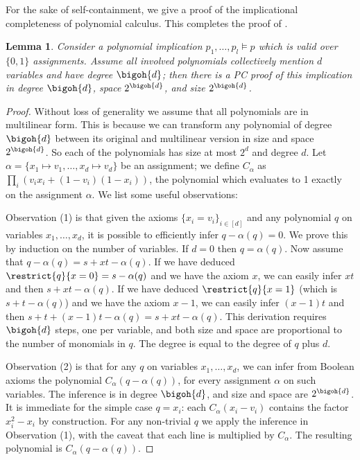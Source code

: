 \documentclass[11pt]{article}
\numberwithin{equation}{section}
\newtheorem{lemma}[theorem]{Lemma}
\theoremstyle{definition}
\theoremstyle{plain}
\begin{document}
For the sake of self-containment, we give a proof of the
implicational completeness of polynomial calculus. This completes the proof
%
of .    %

\begin{lemma}\label{lmm:pccompleteness}
  Consider a polynomial implication $p_{1}, \ldots, p_{l}\models p$ which is valid over $\{0,1\}$ assignments. Assume all involved polynomials collectively mention $d$ variables and have degree $\bigoh{d}$; then there is a PC proof of this implication in degree $\bigoh{d}$, space $2^{\bigoh{d}}$, and size $2^{\bigoh{d}}$.
\end{lemma}
\begin{proof} Without loss of generality we assume that all
  polynomials are in multilinear form. This is because we can
  transform any polynomial of degree $\bigoh{d}$ between its original
  and multilinear version in size and space $2^{\bigoh{d}}$. So each
  of the polynomials has size at most $2^{d}$ and degree $d$.
  Let $\alpha=\{x_{1}\mapsto v_{1}, \ldots, x_{d}\mapsto v_{d}\}$ be an assignment; we define $C_{\alpha}$ as $\prod_{i} (v_{i}x_{i} + (1-v_{i})(1-x_{i}))$, the polynomial which evaluates to 1 exactly on the assignment $\alpha$. We list some useful observations:

Observation (1) is that given the axioms $\{x_{i}=v_{i}\}_{i\in[d]}$
and any polynomial $q$ on variables $x_{1},\ldots,x_{d}$, it is
possible to efficiently infer $q-\alpha(q)=0$. We prove this by induction on the number of variables. If $d=0$ then $q=\alpha(q)$. Now assume that $q-\alpha(q)=s+xt-\alpha(q)$. If we have deduced $\restrict{q}{x=0}=s-\alpha(q)$ and we have the axiom $x$, we can easily infer $xt$ and then $s+xt-\alpha(q)$. If we have deduced $\restrict{q}{x=1}$ (which is $s+t-\alpha(q)$) and we have the axiom $x-1$, we can easily infer $(x-1)t$ and then $s+t+(x-1)t -\alpha(q) = s + xt -\alpha(q)$.
%
This derivation requires $\bigoh{d}$ steps, one per variable, and both
size and space are proportional to the number of monomials in $q$. The
degree is equal to the degree of $q$ plus $d$.

Observation (2) is that for any $q$ on variables $x_{1},\ldots,x_{d}$,
we can infer from Boolean axioms the polynomial
$C_{\alpha}(q-\alpha(q))$, for every assignment $\alpha$ on such
variables. The inference is in degree $\bigoh{d}$, and size and space are
$2^{\bigoh{d}}$. It is immediate for the simple case $q=x_{i}$: each
$C_{\alpha}(x_{i}-v_{i})$ contains the factor $x^{2}_{i}-x_{i}$ by
construction. For any non-trivial $q$ we apply the inference in
Observation (1), with the caveat that each line is multiplied by
$C_{\alpha}$. The resulting polynomial is $C_{\alpha}(q-\alpha(q))$.


\end{proof}
\end{document}
